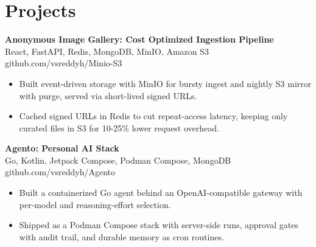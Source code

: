 \documentclass[a4paper,11pt]{article}
\newcommand{\resumeItem}[1]{\item \small{#1}}
\newcommand{\resumeSubheading}[4]{%
  \textbf{#1} \hfill \textbf{#2} \\
{#3} \hfill {#4}
}
\newcommand{\resumeSubHeadingListStart}{\begin{itemize}}
\newcommand{\resumeSubHeadingListEnd}{\end{itemize}}
\begin{document}
\section*{Projects}

\resumeSubheading
{Anonymous Image Gallery: Cost Optimized Ingestion Pipeline}{}{React, FastAPI, Redis, MongoDB, MinIO, Amazon S3}{github.com/vsreddyh/Minio-S3}
\resumeSubHeadingListStart
\resumeItem{Built event-driven storage with MinIO for bursty ingest and nightly S3 mirror with purge, served via short-lived signed URLs.}
\resumeItem{Cached signed URLs in Redis to cut repeat-access latency, keeping only curated files in S3 for 10-25\% lower request overhead.}
\resumeSubHeadingListEnd

\resumeSubheading
{Agento: Personal AI Stack}{}{Go, Kotlin, Jetpack Compose, Podman Compose, MongoDB}{github.com/vsreddyh/Agento}
\resumeSubHeadingListStart
\resumeItem{Built a containerized Go agent behind an OpenAI-compatible gateway with per-model and reasoning-effort selection.}
\resumeItem{Shipped as a Podman Compose stack with server-side runs, approval gates with audit trail, and durable memory as cron routines.}
\resumeSubHeadingListEnd


\vspace{-0.6em}
\end{document}
